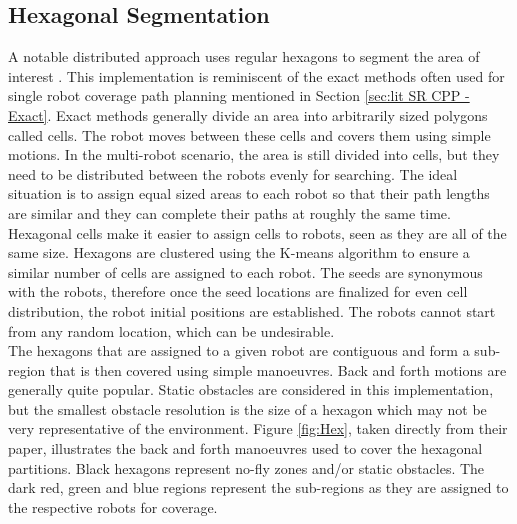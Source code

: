 \subsection{Hexagonal Segmentation}
\label{subsec:Hex}
A notable distributed approach uses regular hexagons to segment the area of interest \cite{Azpurua2018}. This implementation is reminiscent of the exact methods often used for single robot coverage path planning mentioned in Section \ref{sec:lit SR CPP - Exact}. Exact methods generally divide an area into arbitrarily sized polygons called cells. The robot moves between these cells and covers them using simple motions. In the multi-robot scenario, the area is still divided into cells, but they need to be distributed between the robots evenly for searching. The ideal situation is to assign equal sized areas to each robot so that their path lengths are similar and they can complete their paths at roughly the same time.\\
Hexagonal cells make it easier to assign cells to robots, seen as they are all of the same size. Hexagons are clustered using the K-means algorithm to ensure a similar number of cells are assigned to each robot. The seeds are synonymous with the robots, therefore once the seed locations are finalized for even cell distribution, the robot initial positions are established. The robots cannot start from any random location, which can be undesirable. \\
The hexagons that are assigned to a given robot are contiguous and form a sub-region that is then covered using simple manoeuvres. Back and forth motions are generally quite popular. Static obstacles are considered in this implementation, but the smallest obstacle resolution is the size of a hexagon which may not be very representative of the environment. Figure \ref{fig:Hex}, taken directly from their paper, illustrates the back and forth manoeuvres used to cover the hexagonal partitions. Black hexagons represent no-fly zones and/or static obstacles. The dark red, green and blue regions represent the sub-regions as they are assigned to the respective robots for coverage.\\
